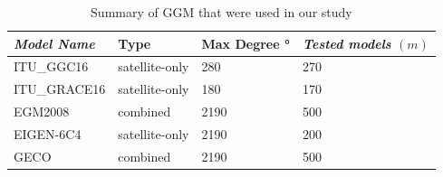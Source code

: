  \begin{table}[]
 	\centering
 	\caption{Summary of GGM that were used in our study}
 	\label{table:ggm_models}
 	\begin{tabular}{@{}llll@{}}
 		\toprule
 		\emph{Model Name} & Type  & Max Degree \si{\degree} & \emph{Tested models} $(m)$\\ \midrule
 		ITU\_GGC16 & satellite-only & 280 & 270 \\
 		ITU\_GRACE16 & satellite-only & 180 & 170\\
 		EGM2008 & combined & 2190 & 500\\
 		EIGEN-6C4 & satellite-only & 2190 & 200\\
 		GECO & combined & 2190 & 500\\ 
 \bottomrule
 		
 	\end{tabular}
 \end{table}
 

